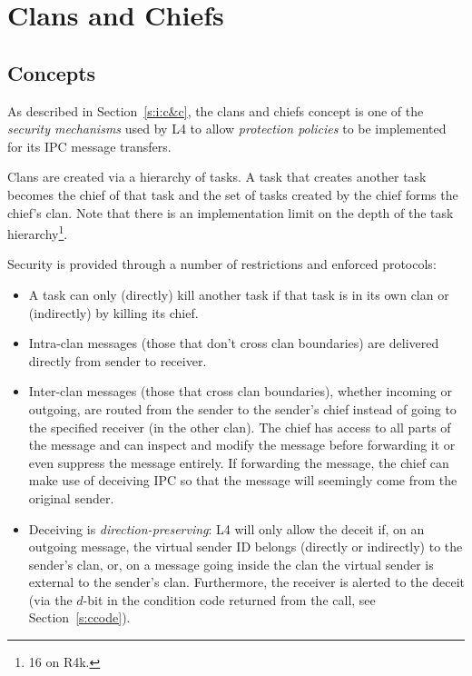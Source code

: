 
\section{Clans and Chiefs}




\subsection{Concepts}


As described in Section~\ref{s:i:c&c}, the clans and chiefs concept is
one of the \emph{security mechanisms} used by L4 to allow
\emph{protection policies} to be implemented for its IPC message
transfers.

Clans are created via a hierarchy of tasks. A task that creates
another task becomes the chief of that task and the set of tasks
created by the chief forms the chief's clan. Note that there is an
implementation limit on the depth of the task hierarchy\footnote{16 on
  R4k.}.

Security is provided through a number of restrictions and enforced
protocols:

\begin{itemize}

\item A task can only (directly) kill another task if that task is in
  its own clan or (indirectly) by killing its chief.

\item Intra-clan messages (those that don't cross clan boundaries) are
  delivered directly from sender to receiver.

\item Inter-clan messages (those that cross clan boundaries), whether
  incoming or outgoing, are routed from the sender to the sender's
  chief instead of going to the specified receiver (in the other
  clan). The chief has access to all parts of the message and can
  inspect and modify the message before forwarding it or even suppress
  the message entirely. If forwarding the message, the chief can make
  use of deceiving IPC so that the message will seemingly come from
  the original sender.

\item Deceiving is \emph{direction-preserving}: L4 will only allow the
  deceit if, on an outgoing message, the virtual sender ID belongs
  (directly or indirectly) to the sender's clan, or, on a message
  going inside the clan the virtual sender is external to the sender's
  clan. Furthermore, the receiver is alerted to the deceit (via the
  \(d\)-bit in the condition code returned from the call, see
  Section~\ref{s:ccode}).


\end{itemize}


